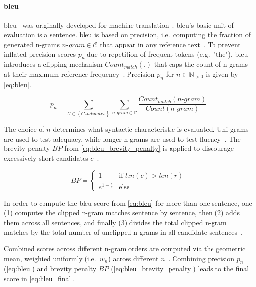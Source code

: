 \paragraph{\ac{bleu}}
\ac{bleu}~\citep{papineni_bleu_2001} was originally developed for machine translation~\citep{zhou_paraphrase_2021,anantha_pearson_metrics_2021}. 
\ac{bleu}'s basic unit of evaluation is a sentence. 
\ac{bleu} is based on precision, i.e.\ computing the fraction of generated n-grams $n\text{-}gram \in \mathcal{C}$ that appear in any reference text~\citep{kurt_pehlivanoglu_comparative_2024,palivela_optimization_2021,papineni_bleu_2001,anantha_pearson_metrics_2021}. 
To prevent inflated precision scores $p_n$ due to repetition of frequent tokens (e.g.\ "the"), \ac{bleu} introduces a clipping mechanism $Count_{match}(.)$ that caps the count of n-grams at their maximum reference frequency~\citep{papineni_bleu_2001}. 
Precision $p_n$ for $n \in \mathbb{N}_{>0}$ is given by \autoref{eq:bleu}.

\begin{equation}
    p_n = \sum_{\mathcal{C} \in \left\{ Candidates \right\}}\sum_{n\text{-}gram \in\mathcal{C}} \frac{Count_{match}(n\text{-}gram)}{Count(n\text{-}gram)}
\label{eq:bleu}
\end{equation}

The choice of $n$ determines what syntactic characteristic is evaluated.
Uni-grams are used to test adequacy, while longer n-grams are used to test fluency~\citep{papineni_bleu_2001}. 
The brevity penalty $BP$ from \autoref{eq:bleu_brevity_penalty} is applied to discourage excessively short candidates $c$~\citep{papineni_bleu_2001}.

\begin{equation}
    BP = \begin{cases}
        1 & \text{if } len(c) > len(r) \\
        e^{1 - \frac{r}{c}} & \text{else}
    \end{cases}
\label{eq:bleu_brevity_penalty}
\end{equation}

In order to compute the \ac{bleu} score from \autoref{eq:bleu} for more than one sentence, 
one (1) computes the clipped n-gram matches sentence by sentence, 
then (2) adds them across all sentences, 
and finally (3) divides the total clipped n-gram matches by 
the total number of unclipped n-grams in all candidate sentences~\citep{papineni_bleu_2001,cordeiro_bleu_2007}.

Combined scores across different n-gram orders are computed via the geometric mean, weighted uniformly (i.e.\ $w_n$) across different $n$~\citep{papineni_bleu_2001,banerjee_METEOR_2005}.
Combining precision $p_n$ (\autoref{eq:bleu}) and brevity penalty $BP$ (\autoref{eq:bleu_brevity_penalty}) leads to the final score in \autoref{eq:bleu_final}.

